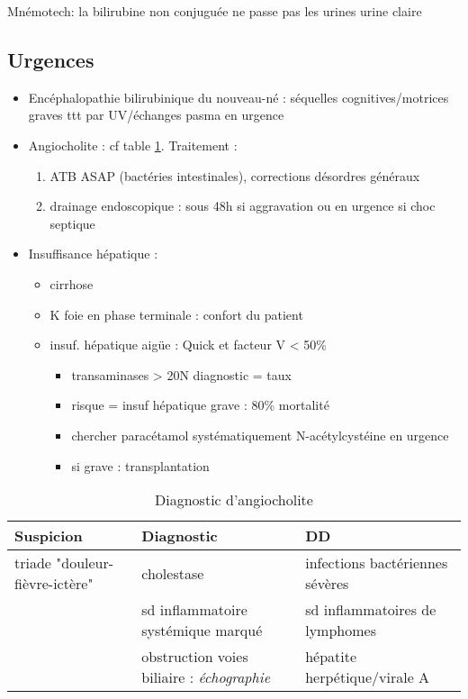 \documentclass[11pt]{article}
\begin{document}
Mnémotech: la bilirubine non conjuguée ne passe pas les urines \thus urine claire

\subsection{Urgences}
\label{sec:orgd6d11a6}
\begin{itemize}
\item Encéphalopathie bilirubinique du nouveau-né : séquelles cognitives/motrices
graves \thus ttt par UV/échanges pasma en urgence 
\item Angiocholite : cf table \ref{tab:org8a00f57}. Traitement :
\begin{enumerate}
\item ATB ASAP (bactéries intestinales), corrections désordres généraux
\item drainage endoscopique : sous 48h si aggravation ou en urgence si choc
septique 
\end{enumerate}
\item Insuffisance hépatique :
\begin{itemize}
\item cirrhose
\item K foie en phase terminale : confort du patient
\item insuf. hépatique aigüe : 
Quick et facteur V < 50\%
\begin{itemize}
\item transaminases > 20N \thus diagnostic = \dec taux
\item risque = insuf hépatique grave : 80\% mortalité 
\item chercher paracétamol systématiquement \thus N-acétylcystéine en urgence
\item si grave : transplantation
\end{itemize}
\end{itemize}
\end{itemize}

\begin{table}[htbp]
\caption{\label{tab:org8a00f57}
Diagnostic d'angiocholite}
\centering
\begin{tabular}{lll}
\toprule
Suspicion & Diagnostic & DD\\
\midrule
triade "douleur-fièvre-ictère" & cholestase & infections bactériennes sévères\\
 & sd inflammatoire systémique marqué & sd inflammatoires de lymphomes\\
 & obstruction voies biliaire : \emph{échographie} & hépatite herpétique/virale A\\
\bottomrule
\end{tabular}
\end{table}
\end{document}
